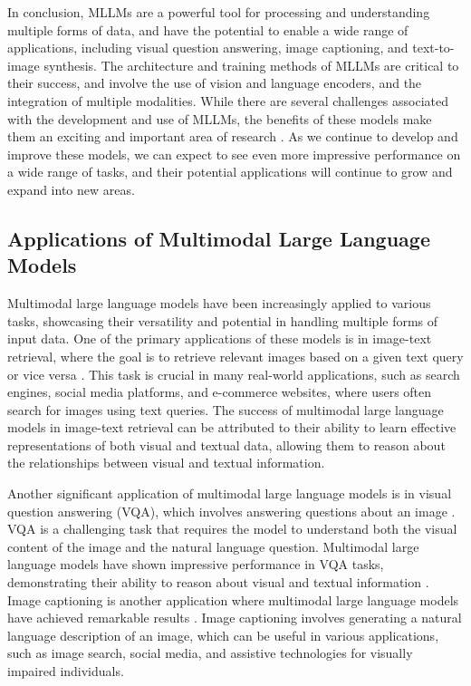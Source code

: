 \documentclass[11pt]{article}
\begin{document}
In conclusion, MLLMs are a powerful tool for processing and understanding multiple forms of data, and have the potential to enable a wide range of applications, including visual question answering, image captioning, and text-to-image synthesis. The architecture and training methods of MLLMs are critical to their success, and involve the use of vision and language encoders, and the integration of multiple modalities. While there are several challenges associated with the development and use of MLLMs, the benefits of these models make them an exciting and important area of research \cite{ref285}. As we continue to develop and improve these models, we can expect to see even more impressive performance on a wide range of tasks, and their potential applications will continue to grow and expand into new areas.

\subsection{Applications of Multimodal Large Language Models}

Multimodal large language models have been increasingly applied to various tasks, showcasing their versatility and potential in handling multiple forms of input data. One of the primary applications of these models is in image-text retrieval, where the goal is to retrieve relevant images based on a given text query or vice versa \cite{ref286}. This task is crucial in many real-world applications, such as search engines, social media platforms, and e-commerce websites, where users often search for images using text queries. The success of multimodal large language models in image-text retrieval can be attributed to their ability to learn effective representations of both visual and textual data, allowing them to reason about the relationships between visual and textual information.

Another significant application of multimodal large language models is in visual question answering (VQA), which involves answering questions about an image \cite{ref287}. VQA is a challenging task that requires the model to understand both the visual content of the image and the natural language question. Multimodal large language models have shown impressive performance in VQA tasks, demonstrating their ability to reason about visual and textual information \cite{ref288}. Image captioning is another application where multimodal large language models have achieved remarkable results \cite{ref289}. Image captioning involves generating a natural language description of an image, which can be useful in various applications, such as image search, social media, and assistive technologies for visually impaired individuals.
\end{document}
